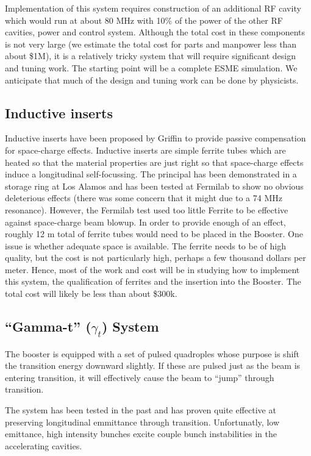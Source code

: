 \documentclass{article}
\begin{document}
Implementation of this system requires construction of an additional RF cavity
which would run at about 80 MHz with 10\% of the power of the other RF
cavities,
power and control system. Although the total cost in these components is not
very large (we estimate the total cost for parts and manpower less than
about \$1M), it is a relatively tricky system that will require significant
design and tuning work. The starting point will be a complete ESME simulation.
We anticipate that much of the design and tuning work can be done by
physicists.

\subsection {Inductive inserts}
   Inductive inserts have been proposed by Griffin \cite {GriffinII} to
provide passive compensation for space-charge effects. Inductive inserts 
are simple ferrite tubes which are heated so that the material properties
are just right so that space-charge effects induce a longitudinal 
self-focussing. The principal has been demonstrated in a storage ring at
Los Alamos and has been tested at Fermilab to show no obvious deleterious
effects (there was some concern that it might due to a 74 MHz resonance).
However, the Fermilab test used too little Ferrite to be effective
against space-charge beam blowup. In order to provide enough of an effect,
roughly 12 m total of ferrite tubes would need to be placed in the Booster.
One issue is whether adequate space is available. The ferrite needs to
be of high quality, but the cost is not particularly high, perhaps a few
thousand dollars per meter. Hence, most of the work and cost will be in
studying how to implement this system, the qualification of ferrites and
the insertion into the Booster. The total cost will likely be less than
about \$300k.

\subsection {``Gamma-t'' ($\gamma_t$) System}

The booster is equipped with a set of pulsed quadroples whose purpose
is shift the transition energy downward slightly.  If these are 
pulsed just as the beam is entering transition, it will effectively
cause the beam to ``jump'' through transition.

The system has been tested in the past and has proven quite
effective at preserving longitudinal emmittance through transition.
Unfortunatly, low emittance, high intensity bunches excite
couple bunch instabilities in the accelerating cavities.
\end{document}
